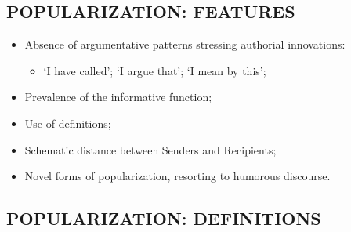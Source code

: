 \subsection{POPULARIZATION: FEATURES}

\begin{itemize}

\item Absence of argumentative patterns stressing authorial innovations:
\begin{itemize}
\item ‘I have called’; ‘I argue that’; ‘I mean by this’;
\end{itemize}

\item Prevalence of the informative function;
\item Use of definitions;
\item Schematic distance between Senders and Recipients;
\item Novel forms of popularization, resorting to humorous discourse. 
\end{itemize}

\subsection{POPULARIZATION: DEFINITIONS}

